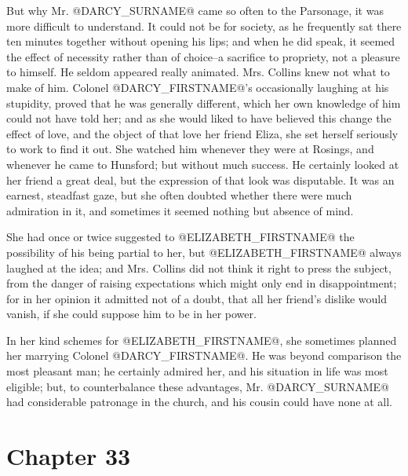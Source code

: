 But why Mr. @DARCY_SURNAME@ came so often to the Parsonage, it was more difficult
to understand. It could not be for society, as he frequently sat there
ten minutes together without opening his lips; and when he did speak,
it seemed the effect of necessity rather than of choice--a sacrifice
to propriety, not a pleasure to himself. He seldom appeared really
animated. Mrs. Collins knew not what to make of him. Colonel
@DARCY_FIRSTNAME@'s occasionally laughing at his stupidity, proved that he was
generally different, which her own knowledge of him could not have told
her; and as she would liked to have believed this change the effect
of love, and the object of that love her friend Eliza, she set herself
seriously to work to find it out. She watched him whenever they were at
Rosings, and whenever he came to Hunsford; but without much success. He
certainly looked at her friend a great deal, but the expression of that
look was disputable. It was an earnest, steadfast gaze, but she often
doubted whether there were much admiration in it, and sometimes it
seemed nothing but absence of mind.

She had once or twice suggested to @ELIZABETH_FIRSTNAME@ the possibility of his
being partial to her, but @ELIZABETH_FIRSTNAME@ always laughed at the idea; and Mrs.
Collins did not think it right to press the subject, from the danger of
raising expectations which might only end in disappointment; for in her
opinion it admitted not of a doubt, that all her friend's dislike would
vanish, if she could suppose him to be in her power.


In her kind schemes for @ELIZABETH_FIRSTNAME@, she sometimes planned her marrying
Colonel @DARCY_FIRSTNAME@. He was beyond comparison the most pleasant man; he
certainly admired her, and his situation in life was most eligible; but,
to counterbalance these advantages, Mr. @DARCY_SURNAME@ had considerable patronage
in the church, and his cousin could have none at all.



\chapter*{Chapter 33}


